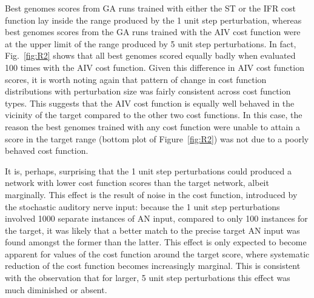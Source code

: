 Best genomes scores from GA runs trained with either the ST or the IFR cost
function lay inside the range produced by the 1 unit step perturbation, whereas
best genomes scores from the GA runs trained with the AIV cost function were at
the upper limit of the range produced by 5 unit step perturbations. In fact,
Fig.~\ref{fig:R2} shows that all best genomes scored equally badly when
evaluated 100 times with the AIV cost function. Given this difference in AIV
cost function scores, it is worth noting again that pattern of change in cost
function distributions with perturbation size was fairly consistent across cost
function types. This suggests that the AIV cost function is equally well behaved
in the vicinity of the target compared to the other two cost functions. In this
case, the reason the best genomes trained with any cost function were unable to
attain a score in the target range (bottom plot of Figure~\ref{fig:R2}) was not
due to a poorly behaved cost function. %


\medskip{}

It is, perhaps, surprising that the 1 unit step perturbations could produced a
network with lower cost function scores than the target network, albeit
marginally. This effect is the result of noise in the cost function, introduced
by the stochastic auditory nerve input: because the 1 unit step perturbations
involved 1000 separate instances of AN input, compared to only 100 instances for
the target, it was likely that a better match to the precise target AN input was
found amongst the former than the latter.  This effect is only expected to
become apparent for values of the cost function around the target score, where
systematic reduction of the cost function becomes increasingly marginal. This is
consistent with the observation that for larger, 5 unit step perturbations this
effect was much diminished or absent.



